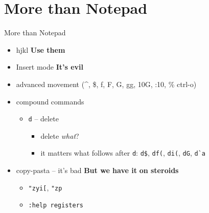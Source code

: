 \documentclass{beamer}
\begin{document}
\section{More than Notepad}
\begin{frame}{More than Notepad}
  \begin{itemize}
    \item hjkl \pause \hspace{1cm} \textbf{Use them}
    \pause
    \item Insert mode \pause \hspace{1cm} \textbf{It's evil}
    \pause
    \item advanced movement (\^{}, \$, f, F, G, gg, 10G, :10, \% ctrl-o)
    \pause
    \item compound commands
    \pause
    \begin{itemize}
      \item \texttt{d} -- delete
      \begin{itemize}
        \item delete \emph{what}?
        \pause
        \item it matters what follows after \texttt{d}: \texttt{d\$},
          \texttt{df(}, \texttt{di(}, \texttt{dG}, \texttt{d\`{}a}
      \end{itemize}
    \end{itemize}
    \pause
    \item copy-pasta -- it's bad \pause \hspace{1cm} \textbf{But we have it}
    \pause \textbf{on steroids}
    \begin{itemize}
      \pause
      \item \texttt{"zyi[}, \texttt{"zp}
      \item \texttt{:help registers}
    \end{itemize}
  \end{itemize}
\end{frame}
\end{document}
